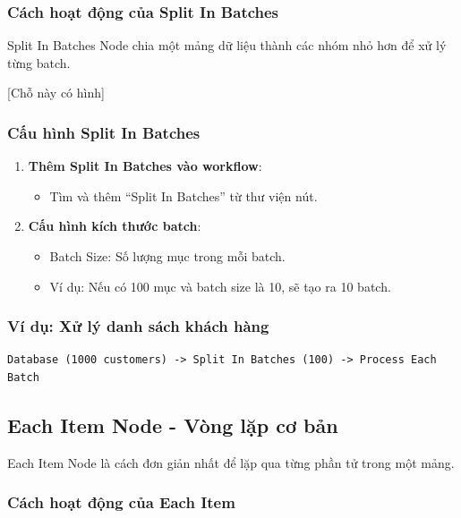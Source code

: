 \subsubsection{Cách hoạt động của Split In Batches}

Split In Batches Node chia một mảng dữ liệu thành các nhóm nhỏ hơn để xử lý từng batch.

[Chỗ này có hình]

\subsubsection{Cấu hình Split In Batches}

\begin{enumerate}
  \item \textbf{Thêm Split In Batches vào workflow}:
  \begin{itemize}
    \item Tìm và thêm ``Split In Batches'' từ thư viện nút.
  \end{itemize}

  \item \textbf{Cấu hình kích thước batch}:
  \begin{itemize}
    \item Batch Size: Số lượng mục trong mỗi batch.
    \item Ví dụ: Nếu có 100 mục và batch size là 10, sẽ tạo ra 10 batch.
  \end{itemize}
\end{enumerate}

\subsubsection{Ví dụ: Xử lý danh sách khách hàng}

\begin{verbatim}
Database (1000 customers) -> Split In Batches (100) -> Process Each Batch
\end{verbatim}

\subsection{Each Item Node - Vòng lặp cơ bản}

Each Item Node là cách đơn giản nhất để lặp qua từng phần tử trong một mảng.

\subsubsection{Cách hoạt động của Each Item}

